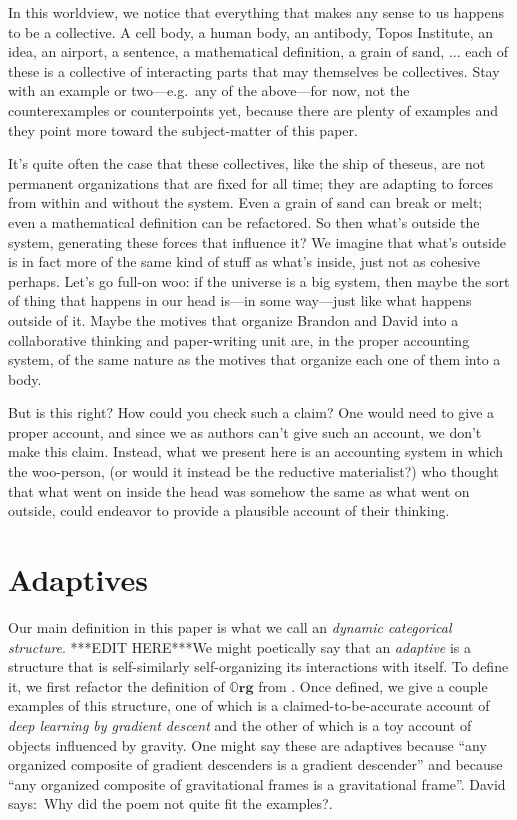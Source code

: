 \documentclass[11pt, one side, article]{memoir}
\theoremstyle{definition}
\theoremstyle{plain}
\newcommand{\Cat}[1]{\mathbf{#1}}%
\newcommand{\0}{\textsf{0}}
\newcommand{\1}{\tn{\textsf{1}}}
\newcommand{\org}{{\mathbb{O}\Cat{rg}}}
\newcommand{\dnote}[1]{{\color{blue}David says:}~#1.\quad{\color{blue}$\lozenge$}}
\begin{document}
In this worldview, we notice that everything that makes any sense to us happens to be a collective. A cell body, a human body, an antibody, Topos Institute, an idea, an airport, a sentence, a mathematical definition, a grain of sand, ... each of these is a collective of interacting parts that may themselves be collectives. Stay with an example or two---e.g.\ any of the above---for now, not the counterexamples or counterpoints yet, because there are plenty of examples and they point more toward the subject-matter of this paper.

It's quite often the case that these collectives, like the ship of theseus, are not permanent organizations that are fixed for all time; they are adapting to forces from within and without the system. Even a grain of sand can break or melt; even a mathematical definition can be refactored. So then what's outside the system, generating these forces that influence it? We imagine that what's outside is in fact more of the same kind of stuff as what's inside, just not as cohesive perhaps. Let's go full-on woo: if the universe is a big system, then maybe the sort of thing that happens in our head is---in some way---just like what happens outside of it. Maybe the motives that organize Brandon and David into a collaborative thinking and paper-writing unit are, in the proper accounting system, of the same nature as the motives that organize each one of them into a body. 

But is this right? How could you check such a claim? One would need to give a proper account, and since we as authors can't give such an account, we don't make this claim. Instead, what we present here is an accounting system in which the woo-person, (or would it instead be the reductive materialist?) who thought that what went on inside the head was somehow the same as what went on outside, could endeavor to provide a plausible account of their thinking.

\section{Adaptives}

Our main definition in this paper is what we call an \emph{dynamic categorical structure}. ***EDIT HERE***We might poetically say that an \emph{adaptive} is a structure that is self-similarly self-organizing its interactions with itself. To define it, we first refactor the definition of $\org$ from \cite{spivak2021learners}. Once defined, we give a couple examples of this structure, one of which is a claimed-to-be-accurate account of \emph{deep learning by gradient descent} and the other of which is a toy account of objects influenced by gravity. One might say these are adaptives because ``any organized composite of gradient descenders is a gradient descender'' and because ``any organized composite of gravitational frames is a gravitational frame''. \dnote{Why did the poem not quite fit the examples?}
\end{document}
